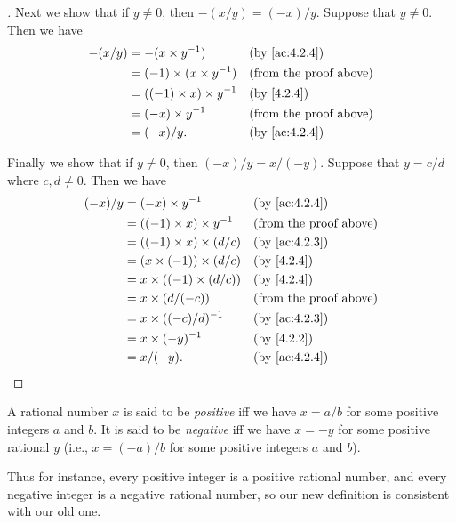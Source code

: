 \begin{proof}[]
  Next we show that if \(y \neq 0\), then \(-(x / y) = (-x) / y\).
  Suppose that \(y \neq 0\).
  Then we have
  \begin{align*}
    -(x / y) & = -(x \times y^{-1})            &  & \by{ac:4.2.4}                 \\
             & = (-1) \times (x \times y^{-1}) &  & \text{(from the proof above)} \\
             & = ((-1) \times x) \times y^{-1} &  & \by{4.2.4}                    \\
             & = (-x) \times y^{-1}            &  & \text{(from the proof above)} \\
             & = (-x) / y.                     &  & \by{ac:4.2.4}
  \end{align*}

  Finally we show that if \(y \neq 0\), then \((-x) / y = x / (-y)\).
  Suppose that \(y = c / d\) where \(c, d \neq 0\).
  Then we have
  \begin{align*}
    (-x) / y & = (-x) \times y^{-1}             &  & \by{ac:4.2.4}                 \\
             & = ((-1) \times x) \times y^{-1}  &  & \text{(from the proof above)} \\
             & = ((-1) \times x) \times (d / c) &  & \by{ac:4.2.3}                 \\
             & = (x \times (-1)) \times (d / c) &  & \by{4.2.4}                    \\
             & = x \times ((-1) \times (d / c)) &  & \by{4.2.4}                    \\
             & = x \times (d / (-c))            &  & \text{(from the proof above)} \\
             & = x \times ((-c) / d)^{-1}       &  & \by{ac:4.2.3}                 \\
             & = x \times (-y)^{-1}             &  & \by{4.2.2}                    \\
             & = x / (-y).                      &  & \by{ac:4.2.4}
  \end{align*}
\end{proof}

\begin{defn}\label{4.2.6}
  A rational number \(x\) is said to be \emph{positive} iff we have \(x = a / b\) for some positive integers \(a\) and \(b\).
  It is said to be \emph{negative} iff we have \(x = -y\) for some positive rational \(y\)
  (i.e., \(x = (-a) / b\) for some positive integers \(a\) and \(b\)).

  Thus for instance, every positive integer is a positive rational number, and every negative integer is a negative rational number, so our new definition is consistent with our old one.
\end{defn}


